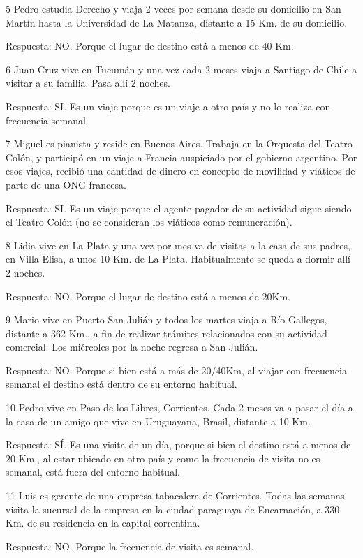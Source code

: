 \documentclass[
  openany]{book}
\begin{document}
5 Pedro estudia Derecho y viaja 2 veces por semana desde su domicilio en San Martín hasta la Universidad de La Matanza, distante a 15 Km. de su domicilio.

Respuesta: NO. Porque el lugar de destino está a menos de 40 Km.

6 Juan Cruz vive en Tucumán y una vez cada 2 meses viaja a Santiago de Chile a visitar a su familia. Pasa allí 2 noches.

Respuesta: SI. Es un viaje porque es un viaje a otro país y no lo realiza con frecuencia semanal.

7 Miguel es pianista y reside en Buenos Aires. Trabaja en la Orquesta del Teatro Colón, y participó en un viaje a Francia auspiciado por el gobierno argentino. Por esos viajes, recibió una cantidad de dinero en concepto de movilidad y viáticos de parte de una ONG francesa.

Respuesta: SI. Es un viaje porque el agente pagador de su actividad sigue siendo el Teatro Colón (no se consideran los viáticos como remuneración).

8 Lidia vive en La Plata y una vez por mes va de visitas a la casa de sus padres, en Villa Elisa, a unos 10 Km. de La Plata. Habitualmente se queda a dormir allí 2 noches.

Respuesta: NO. Porque el lugar de destino está a menos de 20Km.

9 Mario vive en Puerto San Julián y todos los martes viaja a Río Gallegos, distante a 362 Km., a fin de realizar trámites relacionados con su actividad comercial. Los miércoles por la noche regresa a San Julián.

Respuesta: NO. Porque si bien está a más de 20/40Km, al viajar con frecuencia semanal el destino está dentro de su entorno habitual.

10 Pedro vive en Paso de los Libres, Corrientes. Cada 2 meses va a pasar el día a la casa de un amigo que vive en Uruguayana, Brasil, distante a 10 Km.

Respuesta: SÍ. Es una visita de un día, porque si bien el destino está a menos de 20 Km., al estar ubicado en otro país y como la frecuencia de visita no es semanal, está fuera del entorno habitual.

11 Luis es gerente de una empresa tabacalera de Corrientes. Todas las semanas visita la sucursal de la empresa en la ciudad paraguaya de Encarnación, a 330 Km. de su residencia en la capital correntina.

Respuesta: NO. Porque la frecuencia de visita es semanal.
\end{document}
